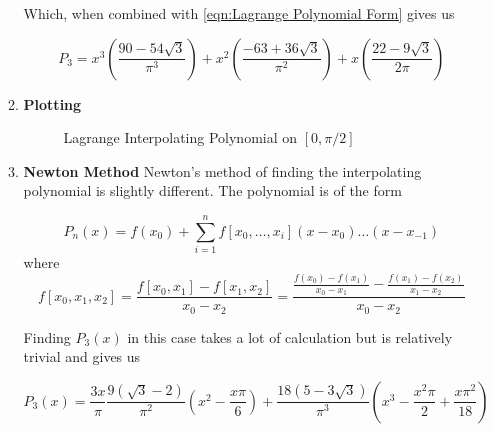 \documentclass[12pt]{article}
\begin{document}
\begin{enumerate}
\begin{enumerate}
            Which, when combined with \autoref{eqn:Lagrange Polynomial Form} gives us 

            \begin{equation}
                P_3 = x^3 \left(\frac{90-54\sqrt{3}}{\pi^3}\right) + x^2 \left(\frac{-63+36\sqrt{3}}{\pi^2}\right) 
                + x \left( \frac{22-9\sqrt{3}}{2\pi}\right)
                \label{eqn:Lagrange Polynomial}
            \end{equation}

            \item \textbf{Plotting} \newline

            \begin{figure}[H]
                \begin{center}
                   \scalebox{.7}{}
                   \caption{Lagrange Interpolating Polynomial on $[0, \pi/2]$}
                   \label{fig:LagrangePlot}
                \end{center}
            \end{figure}
            
            \item \textbf{Newton Method} \newline
            Newton's method of finding the interpolating polynomial is slightly different. The polynomial is 
            of the form 

            \begin{equation}
                P_n(x) = f(x_0) + \sum_{i=1}^n f[x_0, \dots, x_i] (x-x_0)  \dots (x-x_{-1})
                \label{eqn:Newton Polynomial Form}
            \end{equation}
            where
            \begin{equation*}
                f[x_0, x_1, x_2] = \frac{f[x_0, x_1]-f[x_1, x_2]}{x_0-x_2} = \frac{\frac{f(x_0)-f(x_1)}{x_0-x_1}-\frac{f(x_1)-f(x_2)}{x_1-x_2}}{x_0-x_2}
            \end{equation*}

            Finding $P_3(x)$ in this case takes a lot of calculation but is relatively trivial and gives us 

            \begin{equation}
                P_3(x) = \frac{3x}{\pi}\frac{9(\sqrt{3}-2)}{\pi^2}(x^2-\frac{x\pi}{6})+\frac{18(5-3\sqrt{3})}{\pi^3}(x^3-\frac{x^2\pi}{2}+\frac{x\pi^2}{18})
                \label{eqn:Newton Polynomial}
            \end{equation}


\end{enumerate}
\end{enumerate}
\end{document}
